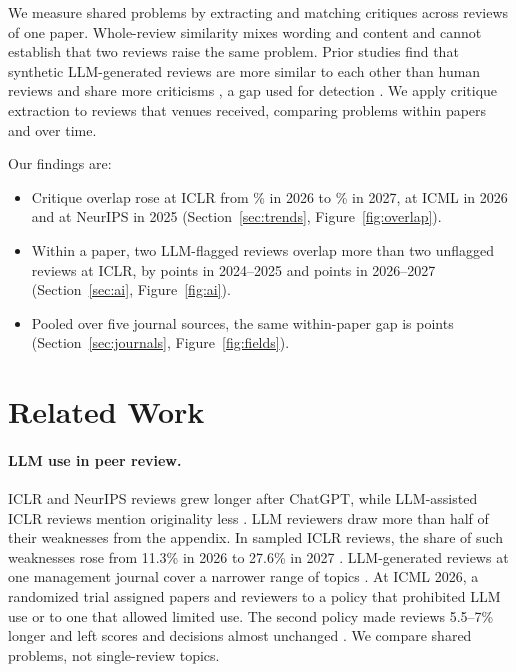 \documentclass[11pt]{article}
\begin{document}
We measure shared problems by extracting and matching critiques across reviews of one paper. Whole-review similarity mixes wording and content \citep{liang2024monitoring,baumann2026stop} and cannot establish that two reviews raise the same problem. Prior studies find that synthetic LLM-generated reviews are more similar to each other than human reviews \citep{hou2026converge} and share more criticisms \citep{kim2026limits}, a gap used for detection \citep{duarte2026semdetect}. We apply critique extraction \citep{liang2024feedback,kim2026limits} to reviews that venues received, comparing problems within papers and over time.

Our findings are:

\begin{itemize}[nosep]
\item Critique overlap rose at ICLR from \IclrSnapBase\% in 2026 to \IclrSnapLast\% in 2027, at ICML in 2026 and at NeurIPS in 2025 (Section~\ref{sec:trends}, Figure~\ref{fig:overlap}).
\item Within a paper, two LLM-flagged reviews overlap more than two unflagged reviews at ICLR, by \FlagGapEarly{} points in 2024--2025 and \FlagGapLate{} points in 2026--2027 (Section~\ref{sec:ai}, Figure~\ref{fig:ai}).
\item Pooled over five journal sources, the same within-paper gap is \JournalGap{} points (Section~\ref{sec:journals}, Figure~\ref{fig:fields}).\label{end:intro}
\end{itemize}

\section{Related Work}
\label{sec:related}

\paragraph{LLM use in peer review.} ICLR and NeurIPS reviews grew longer after ChatGPT, while LLM-assisted ICLR reviews mention originality less \citep{wu2026impact}. LLM reviewers draw more than half of their weaknesses from the appendix. In sampled ICLR reviews, the share of such weaknesses rose from 11.3\% in 2026 to 27.6\% in 2027 \citep{ghosh2026appendix}. LLM-generated reviews at one management journal cover a narrower range of topics \citep{gartenberg2026more}. At ICML 2026, a randomized trial assigned papers and reviewers to a policy that prohibited LLM use or to one that allowed limited use. The second policy made reviews 5.5--7\% longer and left scores and decisions almost unchanged \citep{kim2026icmltrial}. We compare shared problems, not single-review topics.
\end{document}
